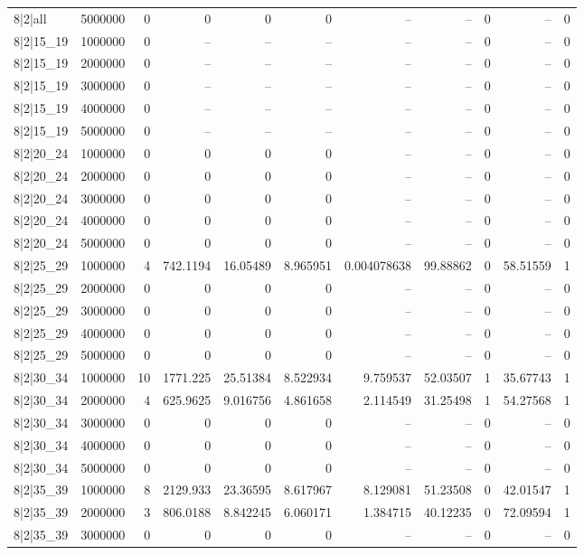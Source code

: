 \begin{tabular}{lrrrrrrrrrr}
8|2|all & 5000000 & 0 & 0 & 0 & 0 & -- & -- & 0 & -- & 0 \\
8|2|15\_19 & 1000000 & 0 & -- & -- & -- & -- & -- & 0 & -- & 0 \\
8|2|15\_19 & 2000000 & 0 & -- & -- & -- & -- & -- & 0 & -- & 0 \\
8|2|15\_19 & 3000000 & 0 & -- & -- & -- & -- & -- & 0 & -- & 0 \\
8|2|15\_19 & 4000000 & 0 & -- & -- & -- & -- & -- & 0 & -- & 0 \\
8|2|15\_19 & 5000000 & 0 & -- & -- & -- & -- & -- & 0 & -- & 0 \\
8|2|20\_24 & 1000000 & 0 & 0 & 0 & 0 & -- & -- & 0 & -- & 0 \\
8|2|20\_24 & 2000000 & 0 & 0 & 0 & 0 & -- & -- & 0 & -- & 0 \\
8|2|20\_24 & 3000000 & 0 & 0 & 0 & 0 & -- & -- & 0 & -- & 0 \\
8|2|20\_24 & 4000000 & 0 & 0 & 0 & 0 & -- & -- & 0 & -- & 0 \\
8|2|20\_24 & 5000000 & 0 & 0 & 0 & 0 & -- & -- & 0 & -- & 0 \\
8|2|25\_29 & 1000000 & 4 & 742.1194 & 16.05489 & 8.965951 & 0.004078638 & 99.88862 & 0 & 58.51559 & 1 \\
8|2|25\_29 & 2000000 & 0 & 0 & 0 & 0 & -- & -- & 0 & -- & 0 \\
8|2|25\_29 & 3000000 & 0 & 0 & 0 & 0 & -- & -- & 0 & -- & 0 \\
8|2|25\_29 & 4000000 & 0 & 0 & 0 & 0 & -- & -- & 0 & -- & 0 \\
8|2|25\_29 & 5000000 & 0 & 0 & 0 & 0 & -- & -- & 0 & -- & 0 \\
8|2|30\_34 & 1000000 & 10 & 1771.225 & 25.51384 & 8.522934 & 9.759537 & 52.03507 & 1 & 35.67743 & 1 \\
8|2|30\_34 & 2000000 & 4 & 625.9625 & 9.016756 & 4.861658 & 2.114549 & 31.25498 & 1 & 54.27568 & 1 \\
8|2|30\_34 & 3000000 & 0 & 0 & 0 & 0 & -- & -- & 0 & -- & 0 \\
8|2|30\_34 & 4000000 & 0 & 0 & 0 & 0 & -- & -- & 0 & -- & 0 \\
8|2|30\_34 & 5000000 & 0 & 0 & 0 & 0 & -- & -- & 0 & -- & 0 \\
8|2|35\_39 & 1000000 & 8 & 2129.933 & 23.36595 & 8.617967 & 8.129081 & 51.23508 & 0 & 42.01547 & 1 \\
8|2|35\_39 & 2000000 & 3 & 806.0188 & 8.842245 & 6.060171 & 1.384715 & 40.12235 & 0 & 72.09594 & 1 \\
8|2|35\_39 & 3000000 & 0 & 0 & 0 & 0 & -- & -- & 0 & -- & 0 \\

\end{tabular}
